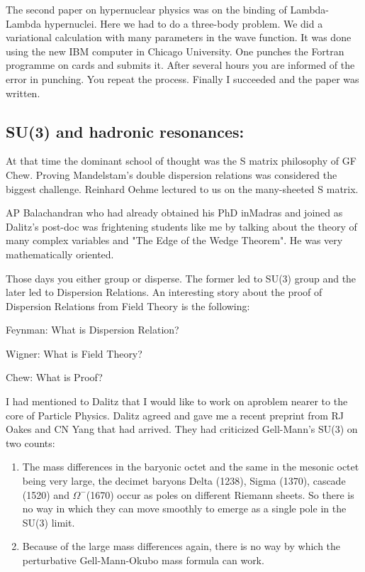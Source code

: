 The second paper on hypernuclear physics was on the binding of 
Lambda-Lambda hypernuclei. Here we had to do a three-body problem. We 
did a variational calculation with many parameters in the wave function. 
It was done using the new IBM computer in Chicago University. One 
punches the Fortran programme on cards and submits it. After several 
hours you are informed of the error in punching. You repeat the process. 
Finally I succeeded and the paper was written.

\vspace{-\topsep}
\subsection*{SU(3) and hadronic resonances:}

At that time the dominant school of thought was the S matrix philosophy 
of GF Chew. Proving Mandelstam's double dispersion relations was 
considered the biggest challenge. Reinhard Oehme lectured to us on the 
many-sheeted S matrix.

AP Balachandran who had already obtained his PhD in\break Madras and joined as 
Dalitz's post-doc was frightening students like me by talking about the 
theory of many complex variables and "The Edge of the Wedge Theorem". He 
was very mathematically oriented.

Those days you either group or disperse. The former led to SU(3) group 
and the later led to Dispersion Relations. An intere\-sting story about 
the proof of Dispersion Relations from Field Theory is the following:

Feynman: What is Dispersion Relation?

Wigner: What is Field Theory?

Chew: What is Proof?

I had mentioned to Dalitz that I would like to work on a\break problem nearer 
to the core of Particle Physics. Dalitz agreed and gave me a recent 
preprint from RJ Oakes and CN Yang that had arrived. They had criticized 
Gell-Mann's SU(3) on two counts:

\begin{enumerate}
\itemsep=0pt
\item The mass differences in the baryonic octet and the same in the mesonic 
octet being very large, the decimet baryons Delta (1238), Sigma (1370), 
cascade (1520) and $\Omega^-$(1670) occur as poles on different Riemann 
sheets. So there is no way in which they can move smoothly to emerge as 
a single pole in the SU(3) limit.
\item Because of the large mass differences again, there is no way by which 
the perturbative Gell-Mann-Okubo mass formula can work.
\end{enumerate}

